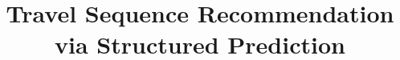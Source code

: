 \documentclass[letterpaper]{article} %
\title{Travel Sequence Recommendation via Structured Prediction}
\newcommand{\eqmoveup}{\vspace{-1.0mm}}                 %
\newcommand{\captionmoveup}{\eqmoveup\vspace{-2.80mm}}   %
\begin{document}
\maketitle

\begin{abstract}

\end{abstract}




%


%


%


\fontsize{9.5pt}{10.5pt} \selectfont



\clearpage
\onecolumn

\end{document}
